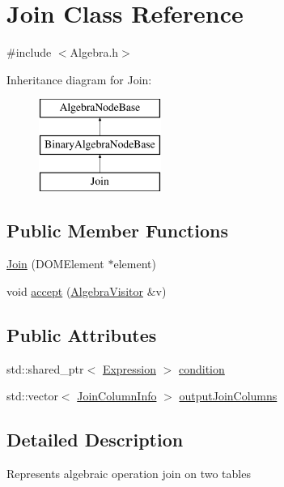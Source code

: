 \hypertarget{class_join}{\section{Join Class Reference}
\label{class_join}
}


{\ttfamily \#include $<$Algebra.\+h$>$}

Inheritance diagram for Join\+:\begin{figure}[H]
\begin{center}
\leavevmode
\includegraphics[height=3.000000cm]{class_join}
\end{center}
\end{figure}
\subsection*{Public Member Functions}
\begin{DoxyCompactItemize}
\item 
\hyperlink{class_join_ac9d8f69a2f72ce85df3e581292c46fc0}{Join} (D\+O\+M\+Element $\ast$element)
\item 
void \hyperlink{class_join_a387b23cf52fa9dc5390f003bcc051cc1}{accept} (\hyperlink{class_algebra_visitor}{Algebra\+Visitor} \&v)
\end{DoxyCompactItemize}
\subsection*{Public Attributes}
\begin{DoxyCompactItemize}
\item 
std\+::shared\+\_\+ptr$<$ \hyperlink{class_expression}{Expression} $>$ \hyperlink{class_join_aa1374c434547d1a0a478a914ac0445bb}{condition}
\item 
std\+::vector$<$ \hyperlink{class_join_column_info}{Join\+Column\+Info} $>$ \hyperlink{class_join_ad0fbf6166d055f84e2a1e9ec5af9824a}{output\+Join\+Columns}
\end{DoxyCompactItemize}


\subsection{Detailed Description}
Represents algebraic operation join on two tables 

